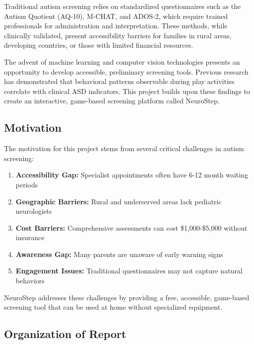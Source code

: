 \documentclass[12pt,letterpaper]{article}
\begin{document}
Traditional autism screening relies on standardized questionnaires such as the Autism Quotient (AQ-10), M-CHAT, and ADOS-2, which require trained professionals for administration and interpretation. These methods, while clinically validated, present accessibility barriers for families in rural areas, developing countries, or those with limited financial resources.

The advent of machine learning and computer vision technologies presents an opportunity to develop accessible, preliminary screening tools. Previous research has demonstrated that behavioral patterns observable during play activities correlate with clinical ASD indicators. This project builds upon these findings to create an interactive, game-based screening platform called NeuroStep.

\subsection{Motivation}

The motivation for this project stems from several critical challenges in autism screening:

\begin{enumerate}
    \item \textbf{Accessibility Gap:} Specialist appointments often have 6-12 month waiting periods
    \item \textbf{Geographic Barriers:} Rural and underserved areas lack pediatric neurologists
    \item \textbf{Cost Barriers:} Comprehensive assessments can cost \$1,000-\$5,000 without insurance
    \item \textbf{Awareness Gap:} Many parents are unaware of early warning signs
    \item \textbf{Engagement Issues:} Traditional questionnaires may not capture natural behaviors
\end{enumerate}

NeuroStep addresses these challenges by providing a free, accessible, game-based screening tool that can be used at home without specialized equipment.

\subsection{Organization of Report}
\end{document}
